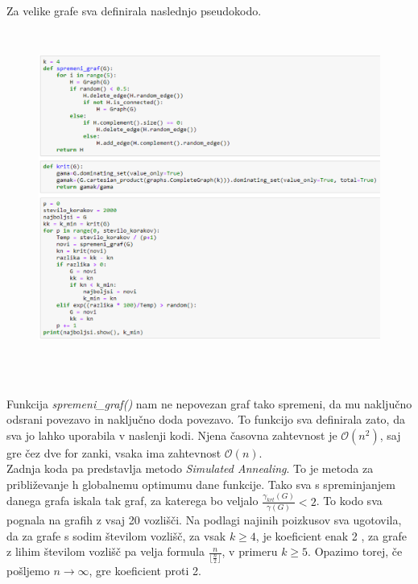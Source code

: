 \documentclass[a4paper]{article}
\begin{document}
Za velike grafe sva definirala naslednjo pseudokodo.
\begin{figure}[h!]
    \centering
    \includegraphics[width=13cm, height=11cm]{Slika4}
    \label{fig:mesh1}
\end{figure}\\
Funkcija \textit{spremeni\_graf()} nam ne nepovezan graf tako spremeni, da mu naključno odsrani povezavo in naključno doda povezavo. To funkcijo sva definirala zato, da sva jo lahko uporabila v naslenji kodi. Njena časovna zahtevnost je $\mathcal{O}(n^2)$, saj gre čez dve for zanki, vsaka ima zahtevnost $\mathcal{O}(n)$.\\
Zadnja koda pa predstavlja metodo \textit{Simulated Annealing}. To je metoda za približevanje h globalnemu optimumu dane funkcije. Tako sva s spreminjanjem danega grafa iskala tak graf, za katerega bo veljalo $\frac{\gamma_{krt}(G)}{\gamma(G)} < 2$. To kodo sva pognala na grafih z vsaj 20 vozlišči. Na podlagi najinih poizkusov sva ugotovila, da za grafe s sodim številom vozlišč, za vsak $k \ge 4$, je koeficient enak 2 , za grafe z lihim številom vozlišč pa velja formula $\frac{n}{\lfloor{\frac{n}{2}}\rfloor}$, v primeru $k \ge 5$. Opazimo torej, če pošljemo $n \rightarrow \infty$, gre koeficient proti 2.\\
\pagebreak
\end{document}
